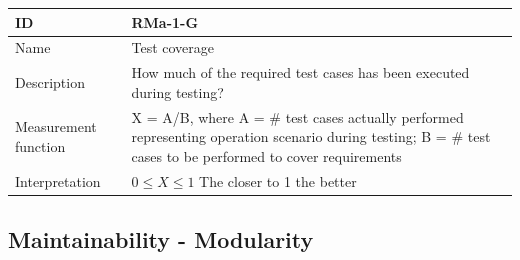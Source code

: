 \begin{table}[h!]
  \renewcommand{\arraystretch}{1.4}
  \centering
  \begin{tabularx}{\textwidth}{l X}
    \toprule
    \textbf{ID}          & \textbf{RMa-1-G}                                                                                                                                             \\
    \midrule
    Name                 & Test coverage                                                                                                                                                \\
    Description          & How much of the required test cases has been executed during testing?                                                                                        \\
    Measurement function & X = A/B, where A = \#  test cases actually performed representing operation scenario during testing; B = \# test cases to be performed to cover requirements \\
    Interpretation       & $0 \leq X \leq 1$ The closer to 1 the better                                                                                                                 \\
    \bottomrule
  \end{tabularx}
\end{table}

\subsection{Maintainability - Modularity}

